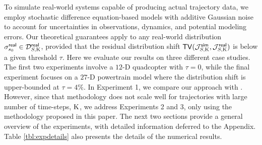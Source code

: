 
To simulate real-world systems capable of producing actual trajectory data, we employ stochastic difference equation-based models with additive Gaussian noise to account for uncertainties in observations, dynamics, and potential modeling errors. Our theoretical guarantees apply to any real-world distribution $\sigma^{\mathsf{real}}_{s_0} \in \mathcal{D}_{S,\mathrm{K}}^{\mathsf{real}}$, provided that the residual distribution shift $\mathsf{TV}(\mathcal{J}_{S,\mathrm{K}}^{\mathsf{sim}}, \mathcal{J}_{S,\mathrm{K}}^{\mathsf{real}})$ is below a given threshold $\tau$. Here we evaluate our results on three different case studies. The first two experiments involve a $12$-D quadcopter with $\tau = 0$, while the final experiment focuses on a $27$-D powertrain model where the distribution shift is upper-bounded at $\tau = 4\%$. In Experiment 1, we compare our approach with \cite{hashemi2024statistical}. However, since that methodology does not scale well for trajectories with large number of time-steps, $\mathrm{K}$, we address Experiments 2 and 3, only using the methodology proposed in this paper. The next two sections provide a general overview of the experiments, with detailed information deferred to the Appendix. Table \ref{tbl:expdetails} also presents the details of the numerical results.


